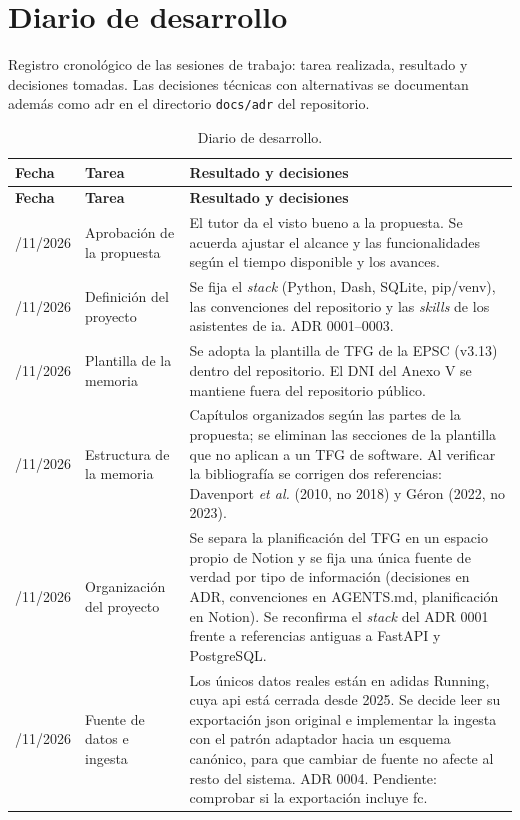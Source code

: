 \chapter{Diario de desarrollo}
\label{anx:diario}

Registro cronológico de las sesiones de trabajo: tarea realizada, resultado y decisiones tomadas. Las decisiones técnicas con alternativas se documentan además como \gls{adr} en el directorio \texttt{docs/adr} del repositorio.

\begin{longtable}{@{}>{\raggedright\arraybackslash}p{2.1cm}>{\raggedright\arraybackslash}p{4.2cm}>{\raggedright\arraybackslash}p{7.7cm}@{}}
\caption{Diario de desarrollo.}\label{tab:diario}\\
\toprule
\textbf{Fecha} & \textbf{Tarea} & \textbf{Resultado y decisiones} \\
\midrule
\endfirsthead
\toprule
\textbf{Fecha} & \textbf{Tarea} & \textbf{Resultado y decisiones} \\
\midrule
\endhead
\bottomrule
\endfoot
10/11/2026 & Aprobación de la propuesta & El tutor da el visto bueno a la propuesta. Se acuerda ajustar el alcance y las funcionalidades según el tiempo disponible y los avances. \\
10/11/2026 & Definición del proyecto & Se fija el \textit{stack} (Python, Dash, SQLite, pip/venv), las convenciones del repositorio y las \textit{skills} de los asistentes de \gls{ia}. ADR 0001--0003. \\
10/11/2026 & Plantilla de la memoria & Se adopta la plantilla de TFG de la EPSC (v3.13) dentro del repositorio. El DNI del Anexo V se mantiene fuera del repositorio público. \\
10/11/2026 & Estructura de la memoria & Capítulos organizados según las partes de la propuesta; se eliminan las secciones de la plantilla que no aplican a un TFG de software. Al verificar la bibliografía se corrigen dos referencias: Davenport \textit{et al.} (2010, no 2018) y Géron (2022, no 2023). \\
12/11/2026 & Organización del proyecto & Se separa la planificación del TFG en un espacio propio de Notion y se fija una única fuente de verdad por tipo de información (decisiones en ADR, convenciones en AGENTS.md, planificación en Notion). Se reconfirma el \textit{stack} del ADR 0001 frente a referencias antiguas a FastAPI y PostgreSQL. \\
12/11/2026 & Fuente de datos e ingesta & Los únicos datos reales están en adidas Running, cuya \gls{api} está cerrada desde 2025. Se decide leer su exportación \gls{json} original e implementar la ingesta con el patrón adaptador hacia un esquema canónico, para que cambiar de fuente no afecte al resto del sistema. ADR 0004. Pendiente: comprobar si la exportación incluye \gls{fc}. \\

\end{longtable}
